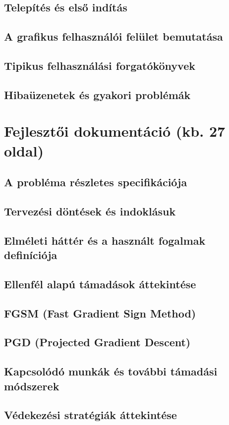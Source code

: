 \documentclass[12pt,a4paper]{article}
\begin{document}
\subsection{Telepítés és első indítás}
\subsection{A grafikus felhasználói felület bemutatása}
\subsection{Tipikus felhasználási forgatókönyvek}
\subsection{Hibaüzenetek és gyakori problémák}

\section{Fejlesztői dokumentáció (kb. 27 oldal)}
\subsection{A probléma részletes specifikációja}
\subsection{Tervezési döntések és indoklásuk}
\subsection{Elméleti háttér és a használt fogalmak definíciója}
\subsection{Ellenfél alapú támadások áttekintése}
\subsection{FGSM (Fast Gradient Sign Method)}
\subsection{PGD (Projected Gradient Descent)}
\subsection{Kapcsolódó munkák és további támadási módszerek}
\subsection{Védekezési stratégiák áttekintése}
\end{document}

